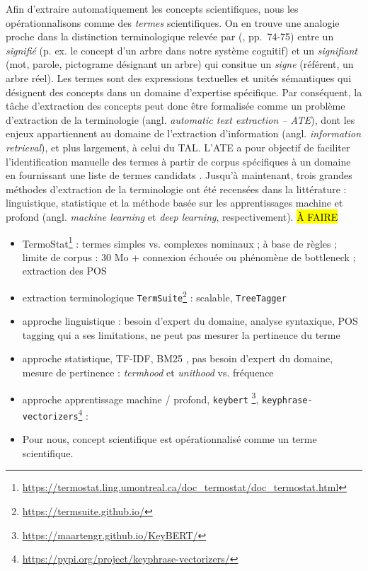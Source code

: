 Afin d'extraire automatiquement les concepts scientifiques, nous les opérationnalisons comme des \textit{termes} scientifiques. On en trouve une analogie proche dans la distinction terminologique relevée par \citeauthor{saussure1915} (\citeyear{saussure1915}, pp.~74-75) entre un \textit{signifié} (p. ex. le concept d'un arbre dans notre système cognitif) et un \textit{signifiant} (mot, parole, pictograme désignant un arbre) qui consitue un \textit{signe} (référent, un arbre réel). Les termes sont des expressions textuelles et unités sémantiques qui désignent des concepts dans un domaine d'expertise spécifique. Par conséquent, la tâche d'extraction des concepts peut donc être formalisée comme un problème d'extraction de la terminologie (angl. \textit{automatic text extraction -- \textsc{ATE}}), dont les enjeux appartiennent au domaine de l'extraction d'information (angl. \textit{information retrieval}), et plus largement, à celui du \textsc{TAL}. L'\textsc{ATE} a pour objectif de faciliter l'identification manuelle des termes à partir de corpus spécifiques à un domaine en fournissant une liste de termes candidats \citep[p.~1]{tran2023recent}. Jusqu'à maintenant, trois grandes méthodes d'extraction de la terminologie ont été recensées dans la littérature : linguistique, statistique et la méthode basée sur les apprentissages machine et profond (angl. \textit{machine learning} et \textit{deep learning}, respectivement).
\hl{À FAIRE}
\begin{itemize}
	\item TermoStat\footnote{\url{https://termostat.ling.umontreal.ca/doc_termostat/doc_termostat.html}} \citep{drouin2003} : termes simples vs. complexes nominaux ; à base de règles ; limite de corpus : 30 Mo + connexion échouée ou phénomène de bottleneck ; extraction des POS
	\item extraction terminologique \texttt{TermSuite}\footnote{\url{https://termsuite.github.io/}} \citep{cram2016terminology} : scalable, \texttt{TreeTagger}
	\item approche linguistique : besoin d'expert du domaine, analyse syntaxique, POS tagging qui a ses limitations, ne peut pas mesurer la pertinence du terme
	\item approche statistique, \textsc{TF-IDF}, \textsc{BM25} \citep{robertson1976relevance}, pas besoin d'expert du domaine, mesure de pertinence : \textit{termhood} et \textit{unithood} \citep[pp.~6-7]{kageura1996} vs. fréquence
	\item approche apprentissage machine / profond, \texttt{keybert} \citep{grootendorst2023}\footnote{\url{https://maartengr.github.io/KeyBERT/}}, \texttt{keyphrase-vectorizers}\footnote{\url{https://pypi.org/project/keyphrase-vectorizers/}}  : \citep{tran2023recent}
	\item Pour nous, concept scientifique est opérationnalisé comme un terme scientifique.
\end{itemize}




